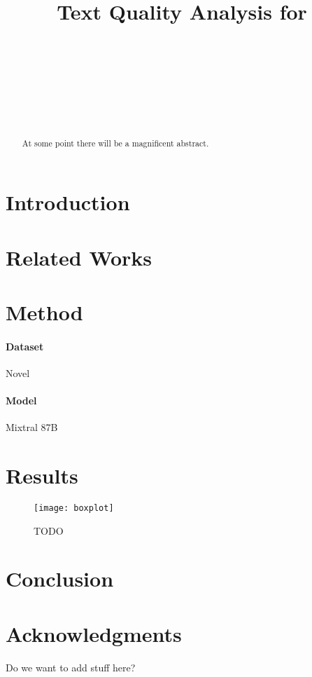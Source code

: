 \documentclass[11pt]{article}
\title{Text Quality Analysis for \todo{LLM-Generated Humor}}
\author{\todo{First Author}\\
  \todo{School (optional)} \\
  \todo{E-Mail (optional)} \\\And
  \todo{Second Author} \\
  \todo{School (optional)} \\
  \todo{E-Mail (optional)} \\
}
\begin{document}
\maketitle
\begin{abstract}
At some point there will be a magnificent abstract.
\end{abstract}

\section{Introduction}

\section{Related Works}
\cite{vaswani2017}

\section{Method}
\paragraph{Dataset} Novel
\paragraph{Model} Mixtral 8\texttimes 7B \cite{jiang2024}

\section{Results}

\begin{figure}\centering
  \texttt{[image: boxplot]}
  \caption[TODO]{TODO}
  \label{label}
\end{figure}

\section{Conclusion}

\section*{Acknowledgments}
Do we want to add stuff here?


\end{document}

